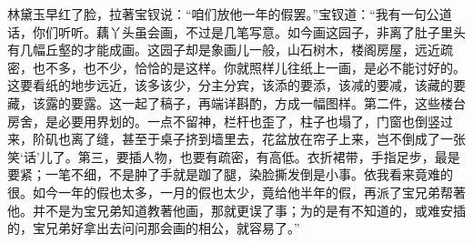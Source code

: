 \begin{parag}


    林黛玉早红了脸，拉著宝钗说：“咱们放他一年的假罢。”宝钗道：“我有一句公道话，你们听听。藕丫头虽会画，不过是几笔写意。如今画这园子，非离了肚子里头有几幅丘壑的才能成画。这园子却是象画儿一般，山石树木，楼阁房屋，远近疏密，也不多，也不少，恰恰的是这样。你就照样儿往纸上一画，是必不能讨好的。这要看纸的地步远近，该多该少，分主分宾，该添的要添，该减的要减，该藏的要藏，该露的要露。这一起了稿子，再端详斟酌，方成一幅图样。第二件，这些楼台房舍，是必要用界划的。一点不留神，栏杆也歪了，柱子也塌了，门窗也倒竖过来，阶矶也离了缝，甚至于桌子挤到墙里去，花盆放在帘子上来，岂不倒成了一张笑‘话’儿了。第三，要插人物，也要有疏密，有高低。衣折裙带，手指足步，最是要紧；一笔不细，不是肿了手就是跏了腿，染脸撕发倒是小事。依我看来竟难的很。如今一年的假也太多，一月的假也太少，竟给他半年的假，再派了宝兄弟帮著他。并不是为宝兄弟知道教著他画，那就更误了事；为的是有不知道的，或难安插的，宝兄弟好拿出去问问那会画的相公，就容易了。”
\end{parag}


